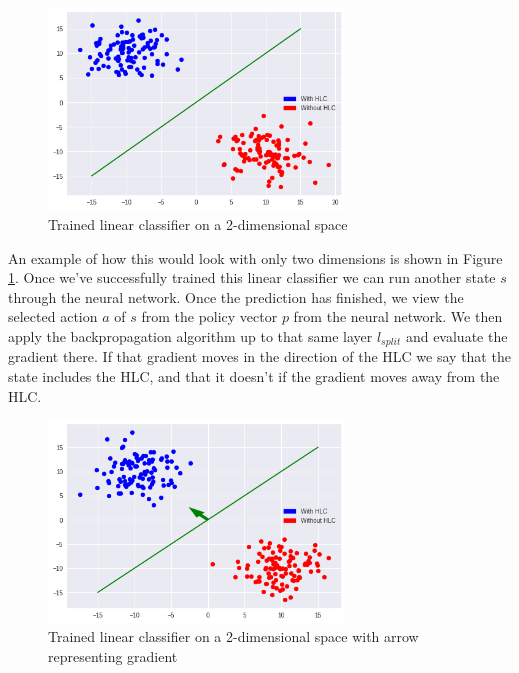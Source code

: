 \begin{figure}[]
    \centering
    \includegraphics[width=0.7\textwidth]{graphics/linear_separation}
    \caption{Trained linear classifier on a 2-dimensional space}
    \label{fig:scattersplit}
\end{figure}

An example of how this would look with only two dimensions is shown in Figure \ref{fig:scattersplit}. Once we've successfully trained this linear classifier we can run another state $s$ through the neural network. Once the prediction has finished, we view the selected action $a$ of $s$ from the policy vector $p$ from the neural network. We then apply the backpropagation algorithm up to that same layer $l_{split}$ and evaluate the gradient there. If that gradient moves in the direction of the HLC we say that the state includes the HLC, and that it doesn't if the gradient moves away from the HLC.

\begin{figure}[]
    \centering
    \includegraphics[width=0.7\textwidth]{graphics/linear_separation_with_direction}
    \caption{Trained linear classifier on a 2-dimensional space with arrow representing gradient}
    \label{fig:scattersplitarrow}
\end{figure}

